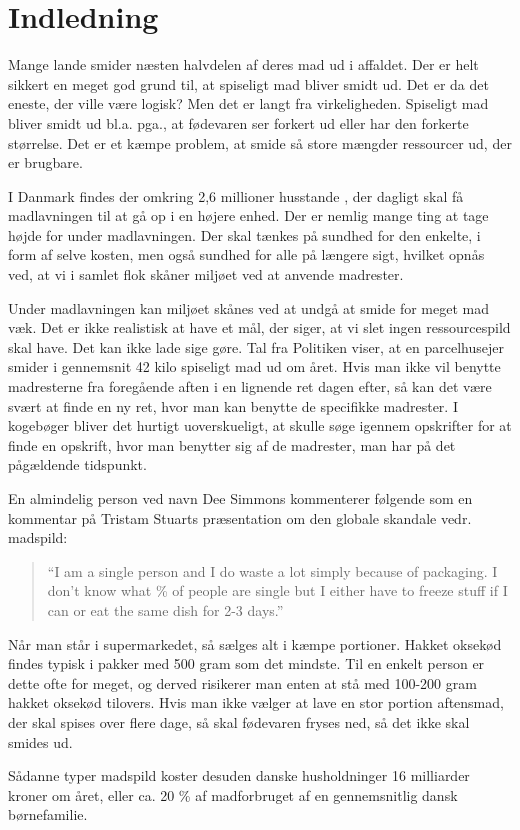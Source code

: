 \section{Indledning}
\label{sec:indledning}

Mange lande smider næsten halvdelen af deres mad ud i affaldet. Der er helt sikkert en meget god grund til, at spiseligt mad bliver smidt ud. Det er da det eneste, der ville være logisk? Men det er langt fra virkeligheden. Spiseligt mad bliver smidt ud bl.a. pga., at fødevaren ser forkert ud eller har den forkerte størrelse. Det er et kæmpe problem, at smide så store mængder ressourcer ud, der er brugbare.\cite{tedmadspild}

I Danmark findes der omkring 2,6 millioner husstande \cite{husstande}, der dagligt skal få madlavningen til at gå op i en højere enhed. Der er nemlig mange ting at tage højde for under madlavningen. Der skal tænkes på sundhed for den enkelte, i form af selve kosten, men også sundhed for alle på længere sigt, hvilket opnås ved, at vi i samlet flok skåner miljøet ved at anvende madrester.

Under madlavningen kan miljøet skånes ved at undgå at smide for meget mad væk. Det er ikke realistisk at have et mål, der siger, at vi slet ingen ressourcespild skal have. Det kan ikke lade sige gøre. \tedmadspild Tal fra Politiken viser, at en parcelhusejer smider i gennemsnit 42 kilo spiseligt mad ud om året. \cite{madspildpol} Hvis man ikke vil benytte madresterne fra foregående aften i en lignende ret dagen efter, så kan det være svært at finde en ny ret, hvor man kan benytte de specifikke madrester. I kogebøger bliver det hurtigt uoverskueligt, at skulle søge igennem opskrifter for at finde en opskrift, hvor man benytter sig af de madrester, man har på det pågældende tidspunkt. 

En almindelig person ved navn Dee Simmons kommenterer følgende\cite{madspildcomment} som en kommentar på Tristam Stuarts præsentation om den globale skandale vedr. madspild:

\begin{quote}
``I am a single person and I do waste a lot simply because of packaging. I don't know what \% of people are single but I either have to freeze stuff if I can or eat the same dish for 2-3 days.''
\end{quote}

Når man står i supermarkedet, så sælges alt i kæmpe portioner. Hakket oksekød findes typisk i pakker med 500 gram som det mindste. Til en enkelt person er dette ofte for meget, og derved risikerer man enten at stå med 100-200 gram hakket oksekød tilovers. Hvis man ikke vælger at lave en stor portion aftensmad, der skal spises over flere dage, så skal fødevaren fryses ned, så det ikke skal smides ud. 

Sådanne typer madspild koster desuden danske husholdninger 16 milliarder kroner om året, eller ca. 20 \% af madforbruget af en gennemsnitlig dansk børnefamilie. \cite{madspild16}
